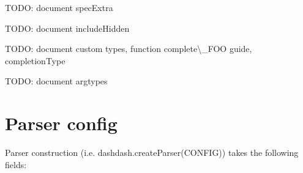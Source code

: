 \begin{DoxyItemize}
\item T\+O\+DO\+: document spec\+Extra
\item T\+O\+DO\+: document include\+Hidden
\item T\+O\+DO\+: document custom types, {\ttfamily function complete\textbackslash{}\+\_\+\+F\+OO} guide, completion\+Type
\item T\+O\+DO\+: document argtypes
\end{DoxyItemize}

\section*{Parser config}

Parser construction (i.\+e. {\ttfamily dashdash.\+create\+Parser(\+C\+O\+N\+F\+I\+G)}) takes the following fields\+:


